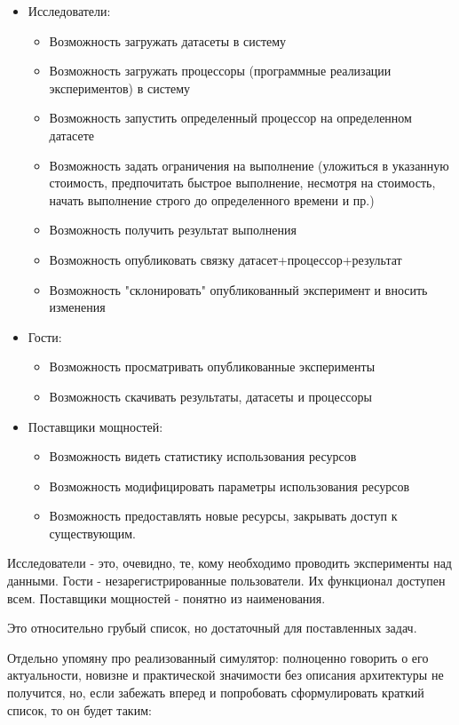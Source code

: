 \begin{itemize}
	\item Исследователи:
	\begin{itemize}
		\item Возможность загружать датасеты в систему
		\item Возможность загружать процессоры (программные реализации экспериментов) в систему
		\item Возможность запустить определенный процессор на определенном датасете
		\item Возможность задать ограничения на выполнение (уложиться в указанную стоимость, предпочитать быстрое выполнение, несмотря на стоимость, начать выполнение строго до определенного времени и пр.)
		\item Возможность получить результат выполнения
		\item Возможность опубликовать связку датасет+процессор+результат
		\item Возможность "склонировать" опубликованный эксперимент и вносить изменения
	\end{itemize}
	\item Гости:
	\begin{itemize}
		\item Возможность просматривать опубликованные эксперименты
		\item Возможность скачивать результаты, датасеты и процессоры
	\end{itemize}
	\item Поставщики мощностей:
	\begin{itemize}
		\item Возможность видеть статистику использования ресурсов
		\item Возможность модифицировать параметры использования ресурсов
		\item Возможность предоставлять новые ресурсы, закрывать доступ к существующим.
	\end{itemize}
\end{itemize}

Исследователи - это, очевидно, те, кому необходимо проводить эксперименты над данными. Гости - незарегистрированные пользователи. Их функционал доступен всем. Поставщики мощностей - понятно из наименования.

Это относительно грубый список, но достаточный для поставленных задач.

Отдельно упомяну про реализованный симулятор: полноценно говорить о его актуальности, новизне и практической значимости без описания архитектуры не получится, но, если забежать вперед и попробовать сформулировать краткий список, то он будет таким:

